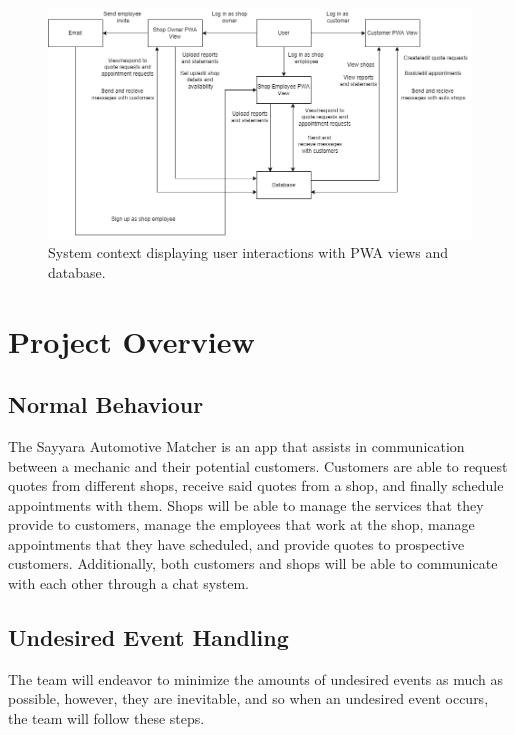 \documentclass[12pt, titlepage]{article}
\begin{document}
\begin{figure}[!Htb]
\centering
 \includegraphics[width=1\textwidth]{SystemContext}
\caption{System context displaying user interactions with PWA views and database. }
\label{Fig_SystemContext} 
\end{figure}

\section{Project Overview}

\subsection{Normal Behaviour}

The Sayyara Automotive Matcher is an app that assists in communication between a mechanic and their potential customers. Customers are able to request quotes from different shops, receive said quotes from a shop, and finally schedule appointments with them. Shops will be able to manage the services that they provide to customers, manage the employees that work at the shop, manage appointments that they have scheduled, and provide quotes to prospective customers. Additionally, both customers and shops will be able to communicate with each other through a chat system.

\subsection{Undesired Event Handling}

The team will endeavor to minimize the amounts of undesired events as much as possible, however, they are inevitable, and so when an undesired event occurs, the team will follow these steps.
\end{document}
